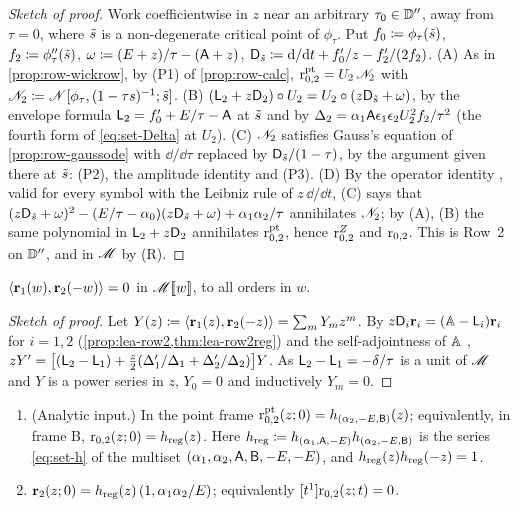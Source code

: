\begin{proof}[Sketch of proof]
Work coefficientwise in $z$ near an arbitrary $\tau_0\in\mathbb{D}''$, away from $\tau=0$, where $\tilde{s}$ is a non-degenerate critical point of $\phi_\tau$. Put $f_0\coloneqq\phi_\tau(\tilde{s})$, $f_2\coloneqq\phi_\tau''(\tilde{s})$, $\omega\coloneqq(E+z)/\tau-(\mathsf{A}+z)$, $\mathsf{D}_{\tilde{s}}\coloneqq\mathrm{d}/\mathrm{d} t+f_0'/z-f_2'/(2f_2)$.
(A) As in \cref{prop:row-wickrow}, by (P1) of \cref{prop:row-calc}, $\mathrm{r}^{\mathrm{pt}}_{0,2}=U_2\,\mathscr{N}_{2}$ with $\mathscr{N}_{2}\coloneqq\mathscr{N}[\phi_\tau,(1-\tau s)^{-1};\tilde{s}]$.
(B) $(\mathsf{L}_2+z\mathsf{D}_2)\circ U_2=U_2\circ(z\mathsf{D}_{\tilde{s}}+\omega)$, by the envelope formula $\mathsf{L}_2=f_0'+E/\tau-\mathsf{A}$ at $\tilde{s}$ and by $\Delta_2=\alpha_1\mathsf{A}\epsilon_1\epsilon_2U_2^2f_2/\tau^2$ (the fourth form of \eqref{eq:set-Delta} at $U_2$).
(C) $\mathscr{N}_{2}$ satisfies Gauss's equation of \cref{prop:row-gaussode} with $\dd/\dd\tau$ replaced by $\mathsf{D}_{\tilde{s}}/(1-\tau)$, by the argument given there at $\tilde{s}$: (P2), the amplitude identity  and (P3).
(D) By the operator identity , valid for every symbol with the Leibniz rule of $z\,\dd/\dd t$, (C) says that $(z\mathsf{D}_{\tilde{s}}+\omega)^2-(E/\tau-\alpha_0)(z\mathsf{D}_{\tilde{s}}+\omega)+\alpha_1\alpha_2/\tau$ annihilates $\mathscr{N}_{2}$; by (A), (B) the same polynomial in $\mathsf{L}_2+z\mathsf{D}_2$ annihilates $\mathrm{r}^{\mathrm{pt}}_{0,2}$, hence $\mathrm{r}^{Z}_{0,2}$ and $\mathrm{r}_{0,2}$. This is Row~2 on $\mathbb{D}''$, and in $\mathscr{M}$ by (R).
\end{proof}

\begin{cor}
\label{cor:lea-orth}
$\langle\mathbf{r}_1(w),\mathbf{r}_2(-w)\rangle=0$ in $\mathscr{M}[\![ w ]\!]$, to all orders in $w$.
\end{cor}

\begin{proof}[Sketch of proof]
Let $Y(z)\coloneqq\langle\mathbf{r}_1(z),\mathbf{r}_2(-z)\rangle=\sum_mY_mz^m$. By $z\mathsf{D}_i\mathbf{r}_i=(\mathbb{A}-\mathsf{L}_i)\mathbf{r}_i$ for $i=1,2$ (\cref{prop:lea-row2,thm:lea-row2reg}) and the self-adjointness of $\mathbb{A}$ , $zY'=\big[(\mathsf{L}_2-\mathsf{L}_1)+\tfrac z2(\Delta_1'/\Delta_1+\Delta_2'/\Delta_2)\big]Y$. As $\mathsf{L}_2-\mathsf{L}_1=-\delta/\tau$ is a unit of $\mathscr{M}$ and $Y$ is a power series in $z$, $Y_0=0$ and inductively $Y_m=0$.
\end{proof}

\begin{prop}[{\Lref{Proposition~4.28}: the regular rows at $t=0$}]
\label{prop:lea-regrows}
\begin{enumerate}
\item[(a)] (Analytic input.) In the point frame $\mathrm{r}^{\mathrm{pt}}_{0,2}(z;0)=h_{(\alpha_2,-E,\mathsf{B})}(z)$; equivalently, in frame B, $\mathrm{r}_{0,2}(z;0)=h_{\mathrm{reg}}(z)$. Here $h_{\mathrm{reg}}\coloneqq h_{(\alpha_1,\mathsf{A},-E)}h_{(\alpha_2,-E,\mathsf{B})}$ is the series \eqref{eq:set-h} of the multiset $(\alpha_1,\alpha_2,\mathsf{A},\mathsf{B},-E,-E)$, and $h_{\mathrm{reg}}(z)h_{\mathrm{reg}}(-z)=1$.
\item[(b)] $\mathbf{r}_2(z;0)=h_{\mathrm{reg}}(z)\,(1,\alpha_1\alpha_2/E)$; equivalently $[t^1]\mathrm{r}_{0,2}(z;t)=0$.
\end{enumerate}
\end{prop}

